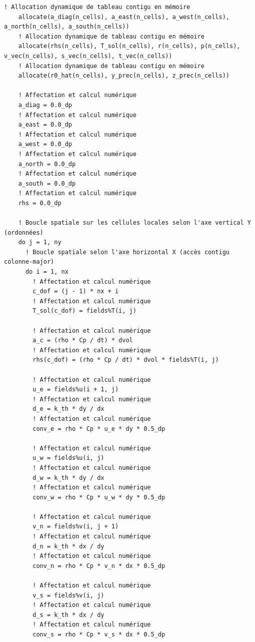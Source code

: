 \documentclass[10pt,a4paper,oneside]{book}
\begin{document}
\begin{lstlisting}[language={[95]Fortran}]
    ! Allocation dynamique de tableau contigu en mémoire
    allocate(a_diag(n_cells), a_east(n_cells), a_west(n_cells), a_north(n_cells), a_south(n_cells))
    ! Allocation dynamique de tableau contigu en mémoire
    allocate(rhs(n_cells), T_sol(n_cells), r(n_cells), p(n_cells), v_vec(n_cells), s_vec(n_cells), t_vec(n_cells))
    ! Allocation dynamique de tableau contigu en mémoire
    allocate(r0_hat(n_cells), y_prec(n_cells), z_prec(n_cells))

    ! Affectation et calcul numérique
    a_diag = 0.0_dp
    ! Affectation et calcul numérique
    a_east = 0.0_dp
    ! Affectation et calcul numérique
    a_west = 0.0_dp
    ! Affectation et calcul numérique
    a_north = 0.0_dp
    ! Affectation et calcul numérique
    a_south = 0.0_dp
    ! Affectation et calcul numérique
    rhs = 0.0_dp

    ! Boucle spatiale sur les cellules locales selon l'axe vertical Y (ordonnées)
    do j = 1, ny
      ! Boucle spatiale selon l'axe horizontal X (accès contigu colonne-major)
      do i = 1, nx
        ! Affectation et calcul numérique
        c_dof = (j - 1) * nx + i
        ! Affectation et calcul numérique
        T_sol(c_dof) = fields%T(i, j)

        ! Affectation et calcul numérique
        a_c = (rho * Cp / dt) * dvol
        ! Affectation et calcul numérique
        rhs(c_dof) = (rho * Cp / dt) * dvol * fields%T(i, j)

        ! Affectation et calcul numérique
        u_e = fields%u(i + 1, j)
        ! Affectation et calcul numérique
        d_e = k_th * dy / dx
        ! Affectation et calcul numérique
        conv_e = rho * Cp * u_e * dy * 0.5_dp

        ! Affectation et calcul numérique
        u_w = fields%u(i, j)
        ! Affectation et calcul numérique
        d_w = k_th * dy / dx
        ! Affectation et calcul numérique
        conv_w = rho * Cp * u_w * dy * 0.5_dp

        ! Affectation et calcul numérique
        v_n = fields%v(i, j + 1)
        ! Affectation et calcul numérique
        d_n = k_th * dx / dy
        ! Affectation et calcul numérique
        conv_n = rho * Cp * v_n * dx * 0.5_dp

        ! Affectation et calcul numérique
        v_s = fields%v(i, j)
        ! Affectation et calcul numérique
        d_s = k_th * dx / dy
        ! Affectation et calcul numérique
        conv_s = rho * Cp * v_s * dx * 0.5_dp


\end{lstlisting}
\end{document}
